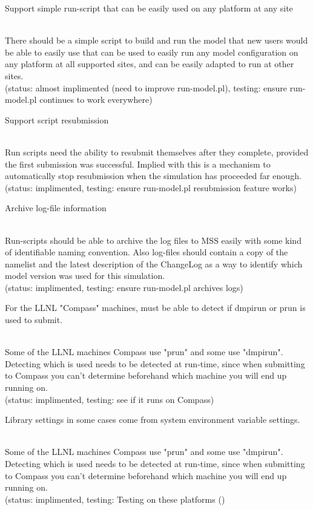 \documentclass[]{article}
\begin{document}
\begin{enumerate}
{\bf\em \item Support simple run-script that can be easily used on any platform at any site}\\
There should be a simple script to build and run the model that new users would be able to
easily use that can be used to easily run any model configuration on any platform at all
supported sites, and can be easily adapted to run at other sites.
\\
(status: almost implimented (need to improve run-model.pl), testing: ensure run-model.pl 
continues to work everywhere)

{\bf\em \item Support script resubmission}\\
Run scripts need the ability to resubmit themselves after they complete, provided the first
submission was successful. Implied with this is a mechanism to automatically stop resubmission 
when the simulation has proceeded far enough.
\\
(status: implimented, testing: ensure run-model.pl resubmission feature works)

{\bf\em \item Archive log-file information}\\
Run-scripts should be able to archive the log files to MSS easily with some kind
of identifiable naming convention. Also log-files should contain a copy of the namelist
and the latest description of the ChangeLog as a way to identify which model version
was used for this simulation.
\\
(status: implimented, testing: ensure run-model.pl archives logs)

{\bf\em \item For the LLNL "Compass" machines, must be able to detect if dmpirun or prun is used
to submit.}\\
Some of the LLNL machines Compass use "prun" and some use "dmpirun". Detecting which is used
needs to be detected at run-time, since when submitting to Compass you can't determine
beforehand which machine you will end up running on.
\\
(status: implimented, testing: see if it runs on Compass)

{\bf\em \item Library settings in some cases come from system environment variable settings.}\\
Some of the LLNL machines Compass use "prun" and some use "dmpirun". Detecting which is used
needs to be detected at run-time, since when submitting to Compass you can't determine
beforehand which machine you will end up running on.
\\
(status: implimented, testing: Testing on these platforms ()


\end{enumerate}
\end{document}
